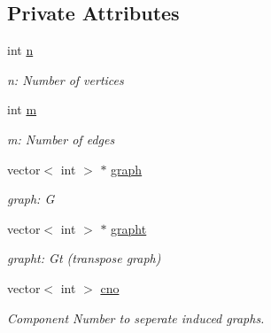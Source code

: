 \subsection*{Private Attributes}
\begin{DoxyCompactItemize}
\item 
\mbox{\label{classDCSC_a8fb298259f65294a77e45bb5b4895171}} 
int \mbox{\hyperlink{classDCSC_a8fb298259f65294a77e45bb5b4895171}{n}}
\begin{DoxyCompactList}\small\item\em n\+: Number of vertices \end{DoxyCompactList}\item 
\mbox{\label{classDCSC_a847c678bc6a65c21fc2ade8fc78b2859}} 
int \mbox{\hyperlink{classDCSC_a847c678bc6a65c21fc2ade8fc78b2859}{m}}
\begin{DoxyCompactList}\small\item\em m\+: Number of edges \end{DoxyCompactList}\item 
\mbox{\label{classDCSC_a8bb8f17a884719c25b0617f2462af75a}} 
vector$<$ int $>$ $\ast$ \mbox{\hyperlink{classDCSC_a8bb8f17a884719c25b0617f2462af75a}{graph}}
\begin{DoxyCompactList}\small\item\em graph\+: G \end{DoxyCompactList}\item 
\mbox{\label{classDCSC_af2907219f01660e8435e02c57b30f049}} 
vector$<$ int $>$ $\ast$ \mbox{\hyperlink{classDCSC_af2907219f01660e8435e02c57b30f049}{grapht}}
\begin{DoxyCompactList}\small\item\em grapht\+: Gt (transpose graph) \end{DoxyCompactList}\item 
\mbox{\label{classDCSC_a34d37c084c51943e2841b7ab70a1e009}} 
vector$<$ int $>$ \mbox{\hyperlink{classDCSC_a34d37c084c51943e2841b7ab70a1e009}{cno}}
\begin{DoxyCompactList}\small\item\em Component Number to seperate induced graphs. \end{DoxyCompactList}\item 
\mbox{\label{classDCSC_a5bdcee3f90e24a2742b10be94dc42502}} 

\end{DoxyCompactItemize}
